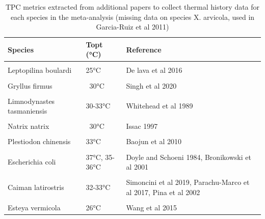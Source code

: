 \documentclass[12pt,twoside]{reedthesis}
\begin{document}
\begin{table}[!h]

\caption[Thermal stress data by species]{\label{tab:unnamed-chunk-31}TPC metrics extracted from additional papers to collect thermal history data for each species in the meta-analysis (missing data on species X. arvicola, used in Garcia-Ruiz et al 2011)}
\centering
\begin{tabular}[t]{ll>{\raggedright\arraybackslash}p{6cm}}
\toprule
\textbf{Species} & \textbf{Topt (°C)} & \textbf{Reference}\\
\midrule
\cellcolor{gray!6}{Drosophila melanogaster} & \cellcolor{gray!6}{24-26.6°C} & \cellcolor{gray!6}{Klepsatel 2013, David 1988}\\
Leptopilina boulardi & 25°C & De lava et al 2016\\
\cellcolor{gray!6}{Mauremys reevesii} & \cellcolor{gray!6}{37.97 ± 0.64 °C} & \cellcolor{gray!6}{Dang et al 2019}\\
Gryllus firmus & ~30°C & Singh et al 2020\\
\cellcolor{gray!6}{Limnodynastes peronii} & \cellcolor{gray!6}{30°C} & \cellcolor{gray!6}{Seebacher et al 2014}\\
\addlinespace
Limnodynastes tasmaniensis & 30-33°C & Whitehead et al 1989\\
\cellcolor{gray!6}{Platyplectrum ornatum} & \cellcolor{gray!6}{33°C} & \cellcolor{gray!6}{Kern et al 2014}\\
Natrix natrix & ~30°C & Issac 1997\\
\cellcolor{gray!6}{Coturnix japoncia} & \cellcolor{gray!6}{26°C} & \cellcolor{gray!6}{Alagawany et al 2017}\\
Plestiodon chinensis & 33°C & Baojun et al 2010\\
\addlinespace
\cellcolor{gray!6}{Rhodnis prolixus} & \cellcolor{gray!6}{30-35°C} & \cellcolor{gray!6}{Fresquet and Lazzari 2011}\\
Escherichia coli & 37°C, 35-36°C & Doyle and Schoeni 1984, Bronikowski et al 2001\\
\cellcolor{gray!6}{Salmonella} & \cellcolor{gray!6}{35-36°C} & \cellcolor{gray!6}{Bronikowski et al 2001}\\
Caiman latirostris & 32-33°C & Simoncini et al 2019, Parachu-Marco et al 2017, Pina et al 2002\\
\cellcolor{gray!6}{Trachemys scripta} & \cellcolor{gray!6}{32-33°C} & \cellcolor{gray!6}{Dang et al 2019}\\
\addlinespace
Esteya vermicola & 26°C & Wang et al 2015\\
\bottomrule
\end{tabular}
\end{table}
\backmatter
\end{document}
